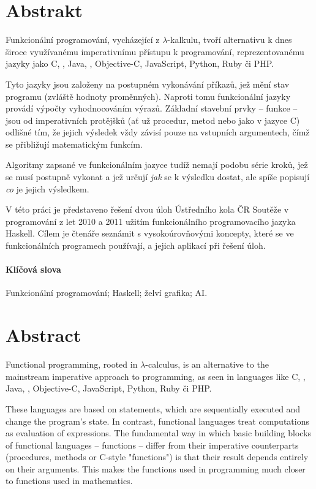 \begin{adjustwidth}{1.5cm}{1.5cm}

\section*{Abstrakt}

Funkcionální programování, vycházející z $\lambda$-kalkulu, tvoří alternativu k
dnes široce využívanému imperativnímu přístupu k programování, reprezentovanému
jazyky jako C, \Cplusplus{}, Java, \Csh{}, Objective-C, JavaScript, Python, Ruby
či PHP.

Tyto jazyky jsou založeny na postupném vykonávání příkazů, jež mění stav
programu (zvláště hodnoty proměnných). Naproti tomu funkcionální jazyky provádí
výpočty vyhodnocováním výrazů. Základní stavební prvky -- funkce -- jsou od
imperativních protějšků (ať už procedur, metod nebo  jako v jazyce C)
odlišné tím, že jejich výsledek vždy závisí pouze na vstupních argumentech, čímž
se přibližují matematickým funkcím.

Algoritmy zapsané ve funkcionálním jazyce tudíž nemají podobu série kroků, jež
se musí postupně vykonat a jež určují \emph{jak} se k výsledku dostat, ale spíše
popisují \emph{co} je jejich výsledkem.

V této práci je představeno řešení dvou úloh Ústředního kola ČR Soutěže v
programování z let 2010 a 2011 užitím funkcionálního programovacího jazyka
Haskell. Cílem je čtenáře seznámit s vysokoúrovňovými koncepty, které se ve
funkcionálních programech používají, a jejich aplikací při řešení
 úloh.

\paragraph*{Klíčová slova}
Funkcionální programování; Haskell; želví grafika; AI.

\section*{Abstract}

Functional programming, rooted in $\lambda$-calculus, is an alternative to the
mainstream imperative approach to programming, as seen in languages like C,
\Cplusplus{}, Java, \Csh{}, Objective-C, JavaScript, Python, Ruby či PHP.

These languages are based on statements, which are sequentially executed and
change the program's state. In contrast, functional languages treat computations
as evaluation of expressions. The fundamental way in which basic building blocks of
functional languages -- functions -- differ from their imperative counterparts
(procedures, methods or C-style "functions") is that their result depends
entirely on their arguments. This makes the functions used in programming much
closer to functions used in mathematics.


\end{adjustwidth}
